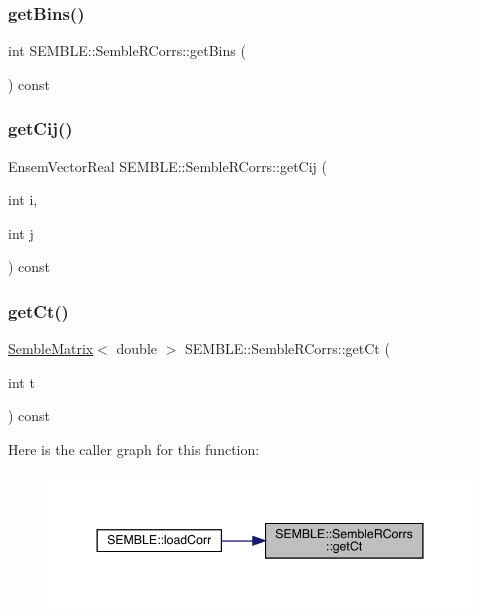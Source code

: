 \subsubsection{\texorpdfstring{getBins()}{getBins()}}
{\footnotesize\ttfamily int S\+E\+M\+B\+L\+E\+::\+Semble\+R\+Corrs\+::get\+Bins (\begin{DoxyParamCaption}{ }\end{DoxyParamCaption}) const}

\mbox{\label{classSEMBLE_1_1SembleRCorrs_ab815db4bf9e18b99168c8870cb6dbee9}} 
\subsubsection{\texorpdfstring{getCij()}{getCij()}}
{\footnotesize\ttfamily Ensem\+Vector\+Real S\+E\+M\+B\+L\+E\+::\+Semble\+R\+Corrs\+::get\+Cij (\begin{DoxyParamCaption}\item[{int}]{i,  }\item[{int}]{j }\end{DoxyParamCaption}) const}

\mbox{\label{classSEMBLE_1_1SembleRCorrs_abd841b0619a827de775801484003e020}} 
\subsubsection{\texorpdfstring{getCt()}{getCt()}}
{\footnotesize\ttfamily \mbox{\hyperlink{structSEMBLE_1_1SembleMatrix}{Semble\+Matrix}}$<$ double $>$ S\+E\+M\+B\+L\+E\+::\+Semble\+R\+Corrs\+::get\+Ct (\begin{DoxyParamCaption}\item[{int}]{t }\end{DoxyParamCaption}) const}

Here is the caller graph for this function\+:
\nopagebreak
\begin{figure}[H]
\begin{center}
\leavevmode
\includegraphics[width=344pt]{d4/d78/classSEMBLE_1_1SembleRCorrs_abd841b0619a827de775801484003e020_icgraph}
\end{center}
\end{figure}
\mbox{\label{classSEMBLE_1_1SembleRCorrs_a30b37ab8e6c87236d82e32e224418c54}} 
